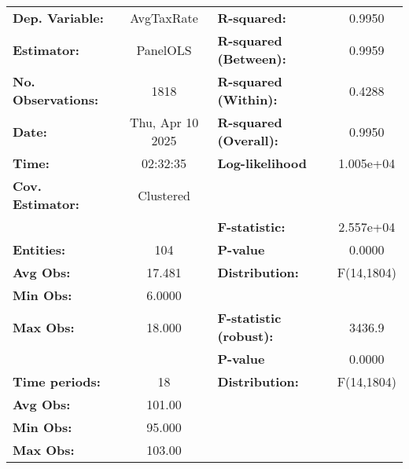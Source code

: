 \begin{center}
\begin{tabular}{lclc}
\toprule
\textbf{Dep. Variable:}                    &     AvgTaxRate     & \textbf{  R-squared:         }   &      0.9950      \\
\textbf{Estimator:}                        &      PanelOLS      & \textbf{  R-squared (Between):}  &      0.9959      \\
\textbf{No. Observations:}                 &        1818        & \textbf{  R-squared (Within):}   &      0.4288      \\
\textbf{Date:}                             &  Thu, Apr 10 2025  & \textbf{  R-squared (Overall):}  &      0.9950      \\
\textbf{Time:}                             &      02:32:35      & \textbf{  Log-likelihood     }   &    1.005e+04     \\
\textbf{Cov. Estimator:}                   &     Clustered      & \textbf{                     }   &                  \\
\textbf{}                                  &                    & \textbf{  F-statistic:       }   &    2.557e+04     \\
\textbf{Entities:}                         &        104         & \textbf{  P-value            }   &      0.0000      \\
\textbf{Avg Obs:}                          &       17.481       & \textbf{  Distribution:      }   &    F(14,1804)    \\
\textbf{Min Obs:}                          &       6.0000       & \textbf{                     }   &                  \\
\textbf{Max Obs:}                          &       18.000       & \textbf{  F-statistic (robust):} &      3436.9      \\
\textbf{}                                  &                    & \textbf{  P-value            }   &      0.0000      \\
\textbf{Time periods:}                     &         18         & \textbf{  Distribution:      }   &    F(14,1804)    \\
\textbf{Avg Obs:}                          &       101.00       & \textbf{                     }   &                  \\
\textbf{Min Obs:}                          &       95.000       & \textbf{                     }   &                  \\
\textbf{Max Obs:}                          &       103.00       & \textbf{                     }   &                  \\

\end{tabular}
\end{center}
